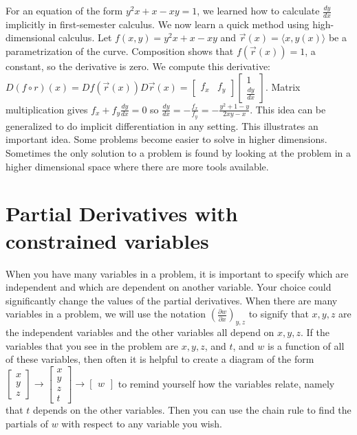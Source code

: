 For an equation of the form $y^2x+x-xy=1$, we learned how to calculate
$\frac{dy}{dx}$ implicitly in first-semester calculus.  We now learn a
quick method using high-dimensional calculus. Let $f(x,y) = y^2x+x-xy$
and $\vec r(x) = \langle x,y(x)\rangle$ be a parametrization of the
curve. Composition shows that $f(\vec r(x))=1$, a constant, so the
derivative is zero.  We compute this derivative: $D(f\circ r)(x) = Df(\vec
r(x))D\vec
r(x)=\begin{bmatrix}f_x& f_y\end{bmatrix}\begin{bmatrix}1 \\
  \frac{dy}{dx}\end{bmatrix}$.  Matrix multiplication gives $f_x+f_y
\frac{dy}{dx}=0$ so $\frac{dy}{dx} = -\frac{f_x}{f_y} =
-\frac{y^2+1-y}{2xy-x}$.  This idea can be generalized to do implicit
differentiation in any setting. This illustrates an important
idea. Some problems become easier to solve in higher dimensions.
Sometimes the only solution to a problem is found by looking at the
problem in a higher dimensional space where there are more tools
available.



\section{Partial Derivatives with constrained variables}
When you have many variables in a problem, it is important to specify
which are independent and which are dependent on another
variable. Your choice could significantly change the values of the
partial derivatives.  When there are many variables in a problem, we
will use the notation {$\displaystyle\left(\frac{\partial w}{\partial
      x}\right)_{y,z}$} to signify that {$x,y,z$} are the independent
variables and the other variables all depend on {$x,y,z$}.  If the
variables that you see in the problem are $x,y,z$, and $t$, and $w$ is
a function of all of these variables, then often it is helpful to
create a diagram of the form $\begin{bmatrix}x\\y\\z\end{bmatrix}\to
\begin{bmatrix}x\\y\\z\\t\end{bmatrix}\to \begin{bmatrix}w\end{bmatrix}$
to remind yourself how the variables relate, namely that $t$ depends
on the other variables.  Then you can use the chain rule to find the
partials of {$w$} with respect to any variable you wish.

